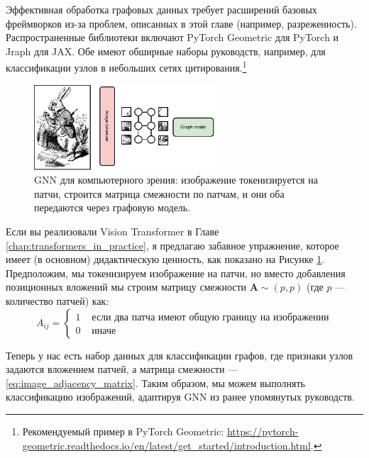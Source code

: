 Эффективная обработка графовых данных требует расширений базовых фреймворков из-за проблем, описанных в этой главе (например, разреженность). Распространенные библиотеки включают PyTorch Geometric для PyTorch и Jraph для JAX. Обе имеют обширные наборы руководств, например, для классификации узлов в небольших сетях цитирования.\footnote{Рекомендуемый пример в PyTorch Geometric: \url{https://pytorch-geometric.readthedocs.io/en/latest/get_started/introduction.html}.}

\begin{figure}
    \centering
    \hspace{1em}\includegraphics[width=0.6\textwidth]{images/ImageGNN}
    \caption{GNN для компьютерного зрения: изображение токенизируется на патчи, строится матрица смежности по патчам, и они оба передаются через графовую модель.}
    \label{fig:image_gnn}
\end{figure}

Если вы реализовали Vision Transformer в Главе \ref{chap:transformers_in_practice}, я предлагаю забавное упражнение, которое имеет (в основном) дидактическую ценность, как показано на Рисунке \ref{fig:image_gnn}. Предположим, мы токенизируем изображение на патчи, но вместо добавления позиционных вложений мы строим матрицу смежности $\mathbf{A} \sim (p, p)$ (где $p$ — количество патчей) как:
%
\begin{equation}
A_{ij} = \begin{cases} 1 & \text{ если два патча имеют общую границу на изображении} \\ 0 & \text{ иначе} \end{cases}
\label{eq:image_adjacency_matrix}
\end{equation}

Теперь у нас есть набор данных для классификации графов, где признаки узлов задаются вложением патчей, а матрица смежности — \eqref{eq:image_adjacency_matrix}. Таким образом, мы можем выполнять классификацию изображений, адаптируя GNN из ранее упомянутых руководств.